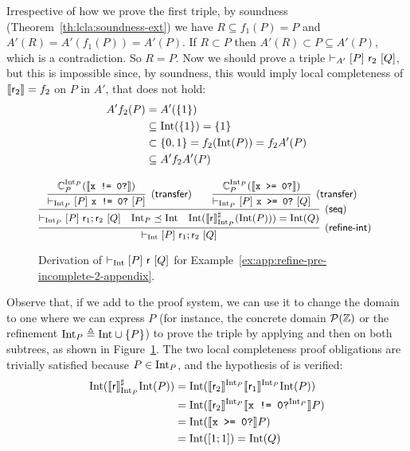 \begin{example}
	Irrespective of how we prove the first triple, by soundness (Theorem~\ref{th:lcla:soundness-ext}) we have $R \subseteq f_1(P) = P$ and $A'(R) = A'(f_1(P)) = A'(P)$. If $R \subset P$ then $A'(R) \subset P \subseteq A'(P)$, which is a contradiction. So $R = P$.
	Now we should prove a triple $\vdash_{A'}\nobreak[P]~\mathsf{r}_2~[Q]$, but this is impossible since, by soundness, this would imply local completeness of $\llbracket\mathsf{r}_2\rrbracket = f_2$ on $P$ in $A'$, that does not hold:
	\begin{align*}
		A' f_2(P) & = A'(\{ 1 \})                                 \\
		          & \subseteq \text{Int}(\{ 1 \}) = \{ 1 \}             \\
		          & \subset \{ 0, 1 \} = f_2(\text{Int}(P)) = f_2 A'(P) \\
		          & \subseteq A' f_2 A'(P)
	\end{align*}

	\begin{figure*}[t]
		\[
		\text{\small
		\infer[(\mathsf{refine\mbox{-}int})]
		{\lcl{\Int}{P}{\regr_1; \regr_2}{Q}}
		{\infer[(\mathsf{seq})]
		{\lcl{\Int_P}{P}{\regr_1; \regr_2}{Q} \quad \Int_P \preceq \Int \quad \Int(\denot{\regr}^{\sharp}_{\Int_P}(\Int(P))) = \Int(Q)}
		{
		\infer[(\mathsf{transfer})]
		{\lcl{\Int_P}{P}{\code{x != 0?}}{P}}{ \complete{\Int_P}{P}{\denot{\code{x != 0?}}} }
		& &
		\infer[(\mathsf{transfer})]
		{\lcl{\Int_P}{P}{\code{x >= 0?}}{Q}}{ \complete{\Int_P}{P}{\denot{\code{x >= 0?}}} }
		}
		}
		}
		\]
		\caption{Derivation of $\vdash_{\text{Int}}\nobreak[P]~\mathsf{r}~[Q]$ for Example~\ref{ex:app:refine-pre-incomplete-2-appendix}.}\label{fig:app:ex-refine-int-incomplete-2}
	\end{figure*}

	Observe that, if we add  to the proof system, we can use it to change the domain to one where we can express $P$ (for instance, the concrete domain $\mathcal{P}(\mathbb{Z})$ or the refinement $\text{Int}_P \triangleq \text{Int} \cup \{ P \}$) to prove the triple by applying  and then  on both subtrees, as shown in Figure~\ref{fig:app:ex-refine-int-incomplete-2}.
	The two local completeness proof obligations are trivially satisfied because $P \in \text{Int}_P$, and the hypothesis of  is verified:
	\begin{align*}
		\text{Int}( \llbracket\mathsf{r}\rrbracket^{\sharp}_{\text{Int}_P} \text{Int}(P)) & = \text{Int}( \llbracket\mathsf{r}_2\rrbracket^{\text{Int}_P} \llbracket\mathsf{r}_1\rrbracket^{\text{Int}_P} \text{Int}(P))  \\
		                                               & = \text{Int}( \llbracket\mathsf{r}_2\rrbracket^{\text{Int}_P} \llbracket\texttt{x != 0?}^{\text{Int}_P}\rrbracket P) \\
		                                               & = \text{Int}( \llbracket\texttt{x >= 0?}\rrbracket P)                                   \\
		                                               & = \text{Int}( [1; 1] ) = \text{Int}(Q)
	\end{align*}
\end{example}

